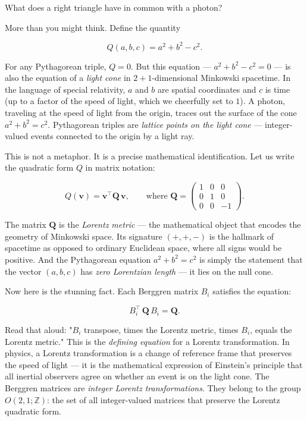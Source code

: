 What does a right triangle have in common with a photon?

More than you might think. Define the quantity

\[
Q(a, b, c) = a^2 + b^2 - c^2.
\]

For any Pythagorean triple, $Q = 0$. But this equation --- $a^2 + b^2 - c^2 = 0$ --- is also the equation of a \textit{light cone} in $2 + 1$-dimensional Minkowski spacetime. In the language of special relativity, $a$ and $b$ are spatial coordinates and $c$ is time (up to a factor of the speed of light, which we cheerfully set to $1$). A photon, traveling at the speed of light from the origin, traces out the surface of the cone $a^2 + b^2 = c^2$. Pythagorean triples are \textit{lattice points on the light cone} --- integer-valued events connected to the origin by a light ray.

This is not a metaphor. It is a precise mathematical identification. Let us write the quadratic form $Q$ in matrix notation:

\[
Q(\mathbf{v}) = \mathbf{v}^\top \mathbf{Q} \, \mathbf{v}, \qquad \text{where } \mathbf{Q} = \begin{pmatrix} 1 & 0 & 0 \\ 0 & 1 & 0 \\ 0 & 0 & -1 \end{pmatrix}.
\]

The matrix $\mathbf{Q}$ is the \textit{Lorentz metric} --- the mathematical object that encodes the geometry of Minkowski space. Its signature $(+, +, -)$ is the hallmark of spacetime as opposed to ordinary Euclidean space, where all signs would be positive. And the Pythagorean equation $a^2 + b^2 = c^2$ is simply the statement that the vector $(a, b, c)$ has \textit{zero Lorentzian length} --- it lies on the null cone.

Now here is the stunning fact. Each Berggren matrix $B_i$ satisfies the equation:

\[
B_i^\top \, \mathbf{Q} \, B_i = \mathbf{Q}.
\]

Read that aloud: "$B_i$ transpose, times the Lorentz metric, times $B_i$, equals the Lorentz metric." This is the \textit{defining equation} for a Lorentz transformation. In physics, a Lorentz transformation is a change of reference frame that preserves the speed of light --- it is the mathematical expression of Einstein's principle that all inertial observers agree on whether an event is on the light cone. The Berggren matrices are \textit{integer Lorentz transformations}. They belong to the group $O(2, 1; \mathbb{Z})$: the set of all integer-valued matrices that preserve the Lorentz quadratic form.

